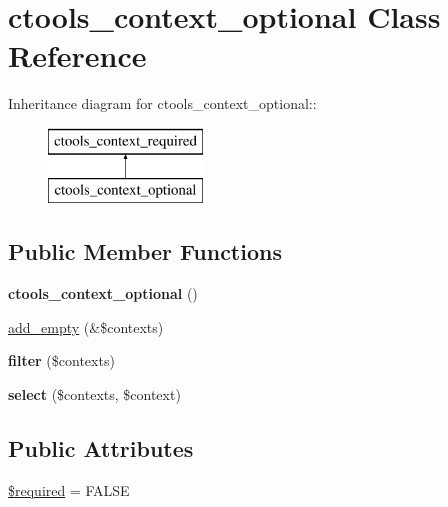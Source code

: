 \hypertarget{classctools__context__optional}{
\section{ctools\_\-context\_\-optional Class Reference}
\label{classctools__context__optional}
}
Inheritance diagram for ctools\_\-context\_\-optional::\begin{figure}[H]
\begin{center}
\leavevmode
\includegraphics[height=2cm]{classctools__context__optional}
\end{center}
\end{figure}
\subsection*{Public Member Functions}
\begin{DoxyCompactItemize}
\item 
\hypertarget{classctools__context__optional_a11865338db36c5f82d3d3b7cd56d93fa}{
{\bfseries ctools\_\-context\_\-optional} ()}
\label{classctools__context__optional_a11865338db36c5f82d3d3b7cd56d93fa}

\item 
\hyperlink{classctools__context__optional_a418c9ddf85538ff466e504f56be250b5}{add\_\-empty} (\&\$contexts)
\item 
\hypertarget{classctools__context__optional_a180a52b208c4816f3a3892aeb935ea22}{
{\bfseries filter} (\$contexts)}
\label{classctools__context__optional_a180a52b208c4816f3a3892aeb935ea22}

\item 
\hypertarget{classctools__context__optional_a3580ff3a9445879dd88e6033e561cf23}{
{\bfseries select} (\$contexts, \$context)}
\label{classctools__context__optional_a3580ff3a9445879dd88e6033e561cf23}

\end{DoxyCompactItemize}
\subsection*{Public Attributes}
\begin{DoxyCompactItemize}
\item 
\hyperlink{classctools__context__optional_ad0c01a0afda900501e6679ce51408737}{\$required} = FALSE
\end{DoxyCompactItemize}



